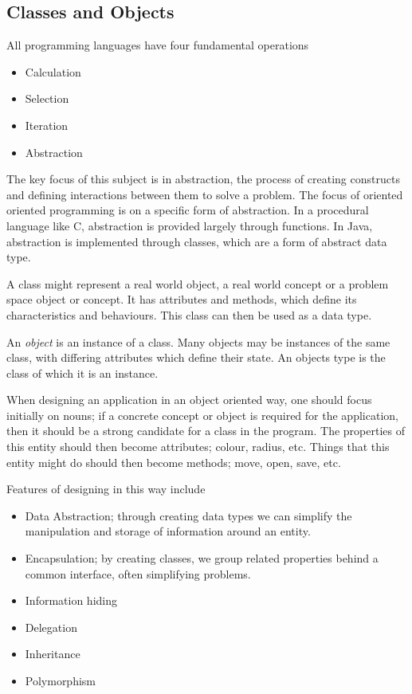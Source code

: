 \documentclass[12pt]{report}
\begin{document}
\begin{flushleft}
\section*{Classes and Objects}
All programming languages have four fundamental operations
\begin{itemize}
    \item Calculation
    \item Selection
    \item Iteration
    \item Abstraction
\end{itemize}
The key focus of this subject is in abstraction, the process of creating
constructs and defining interactions between them to solve a problem. The focus
of oriented oriented programming is on a specific form of abstraction. In a
procedural language like C, abstraction is provided largely through functions.
In Java, abstraction is implemented through classes, which are a form of
abstract data type. \par
A class might represent a real world object, a real world concept or a problem
space object or concept. It has attributes and methods, which define its 
characteristics and behaviours. This class can then be used as a data type.

\bigskip
An \textit{object} is an instance of a class. Many objects may be instances of
the same class, with differing attributes which define their state. An objects
type is the class of which it is an instance.

\bigskip
When designing an application in an object oriented way, one should focus 
initially on nouns; if a concrete concept or object is required for the 
application, then it should be a strong candidate for a class in the program.
The properties of this entity should then become attributes; colour, radius, 
etc. Things that this entity might do should then become methods; move, open,
save, etc.

\bigskip
Features of designing in this way include
\begin{itemize}
    \item Data Abstraction; through creating data types we can simplify the
        manipulation and storage of information around an entity. 
    \item Encapsulation; by creating classes, we group related properties
        behind a common interface, often simplifying problems.
    \item Information hiding
    \item Delegation
    \item Inheritance
    \item Polymorphism
\end{itemize}


\end{flushleft}
\end{document}

